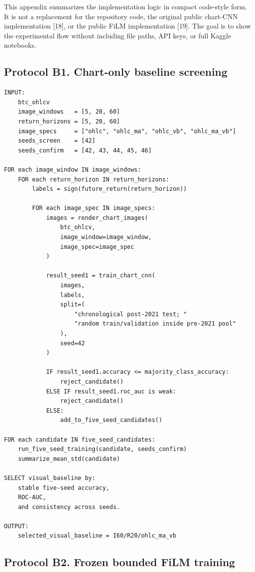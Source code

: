 \documentclass[14pt,a4paper]{extarticle}
\begin{document}
This appendix summarizes the implementation logic in compact code-style form. It is not a replacement for the repository code, the original public chart-CNN implementation [18], or the public FiLM implementation [19]. The goal is to show the experimental flow without including file paths, API keys, or full Kaggle notebooks.

\subsection*{Protocol B1. Chart-only baseline screening}

\begin{lstlisting}[style=protocol]
INPUT:
    btc_ohlcv
    image_windows   = [5, 20, 60]
    return_horizons = [5, 20, 60]
    image_specs     = ["ohlc", "ohlc_ma", "ohlc_vb", "ohlc_ma_vb"]
    seeds_screen    = [42]
    seeds_confirm   = [42, 43, 44, 45, 46]

FOR each image_window IN image_windows:
    FOR each return_horizon IN return_horizons:
        labels = sign(future_return(return_horizon))

        FOR each image_spec IN image_specs:
            images = render_chart_images(
                btc_ohlcv,
                image_window=image_window,
                image_spec=image_spec
            )

            result_seed1 = train_chart_cnn(
                images,
                labels,
                split=(
                    "chronological post-2021 test; "
                    "random train/validation inside pre-2021 pool"
                ),
                seed=42
            )

            IF result_seed1.accuracy <= majority_class_accuracy:
                reject_candidate()
            ELSE IF result_seed1.roc_auc is weak:
                reject_candidate()
            ELSE:
                add_to_five_seed_candidates()

FOR each candidate IN five_seed_candidates:
    run_five_seed_training(candidate, seeds_confirm)
    summarize_mean_std(candidate)

SELECT visual_baseline by:
    stable five-seed accuracy,
    ROC-AUC,
    and consistency across seeds.

OUTPUT:
    selected_visual_baseline = I60/R20/ohlc_ma_vb
\end{lstlisting}

\subsection*{Protocol B2. Frozen bounded FiLM training}
\end{document}
